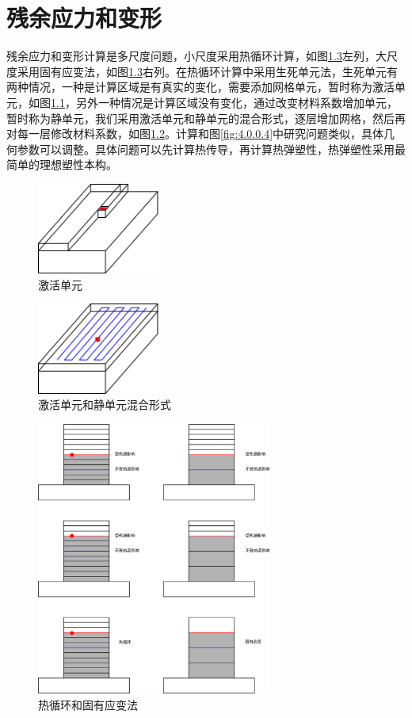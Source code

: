 \chapter{残余应力和变形}

残余应力和变形计算是多尺度问题，小尺度采用热循环计算，如图\ref{fig:4.0.0.3}左列，大尺度采用固有应变法，如图\ref{fig:4.0.0.3}右列。在热循环计算中采用生死单元法，生死单元有两种情况，一种是计算区域是有真实的变化，需要添加网格单元，暂时称为激活单元，如图\ref{fig:4.0.0.1}，另外一种情况是计算区域没有变化，通过改变材料系数增加单元，暂时称为静单元，我们采用激活单元和静单元的混合形式，逐层增加网格，然后再对每一层修改材料系数，如图\ref{fig:4.0.0.2}。计算和图\ref{fig:4.0.0.4}中研究问题类似，具体几何参数可以调整。具体问题可以先计算热传导，再计算热弹塑性，热弹塑性采用最简单的理想塑性本构。

\begin{figure}[!htbp]
  \centering
  \includegraphics[height=3cm]{fig/4/1.png}
  \caption{激活单元}
  \label{fig:4.0.0.1}
\end{figure}

\begin{figure}[!htbp]
  \centering
  \includegraphics[height=3cm]{fig/4/2.png}
  \caption{激活单元和静单元混合形式}
  \label{fig:4.0.0.2}
\end{figure}

\begin{figure}[!htbp]
  \centering
  \includegraphics[height=9cm]{fig/4/3.png}
  \caption{热循环和固有应变法}
  \label{fig:4.0.0.3}
\end{figure}

